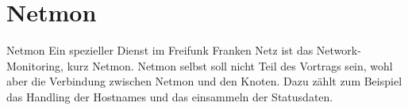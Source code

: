 \section{Netmon}

\begin{frame}{Netmon}
Ein spezieller Dienst im Freifunk Franken Netz ist das
Network-Monitoring, kurz Netmon. Netmon selbst soll nicht Teil des
Vortrags sein, wohl aber die Verbindung zwischen Netmon und den
Knoten. Dazu zählt zum Beispiel das Handling der Hostnames und das
einsammeln der Statusdaten.
\end{frame}
